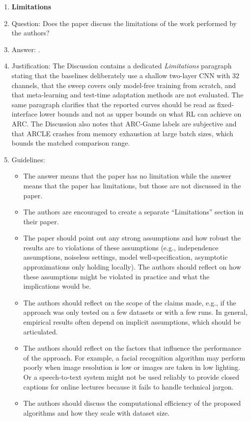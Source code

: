 \begin{enumerate}
\item {\bf Limitations}
    \item[] Question: Does the paper discuss the limitations of the work performed by the authors?
    \item[] Answer: \answerYes{}.
    \item[] Justification: The Discussion contains a dedicated \emph{Limitations} paragraph stating that the baselines deliberately use a shallow two-layer CNN with $32$ channels, that the sweep covers only model-free training from scratch, and that meta-learning and test-time adaptation methods are not evaluated. The same paragraph clarifies that the reported curves should be read as fixed-interface lower bounds and not as upper bounds on what RL can achieve on ARC. The Discussion also notes that ARC-Game labels are subjective and that ARCLE crashes from memory exhaustion at large batch sizes, which bounds the matched comparison range.
    \item[] Guidelines:
    \begin{itemize}
        \item The answer \answerNA{} means that the paper has no limitation while the answer \answerNo{} means that the paper has limitations, but those are not discussed in the paper. 
        \item The authors are encouraged to create a separate ``Limitations'' section in their paper.
        \item The paper should point out any strong assumptions and how robust the results are to violations of these assumptions (e.g., independence assumptions, noiseless settings, model well-specification, asymptotic approximations only holding locally). The authors should reflect on how these assumptions might be violated in practice and what the implications would be.
        \item The authors should reflect on the scope of the claims made, e.g., if the approach was only tested on a few datasets or with a few runs. In general, empirical results often depend on implicit assumptions, which should be articulated.
        \item The authors should reflect on the factors that influence the performance of the approach. For example, a facial recognition algorithm may perform poorly when image resolution is low or images are taken in low lighting. Or a speech-to-text system might not be used reliably to provide closed captions for online lectures because it fails to handle technical jargon.
        \item The authors should discuss the computational efficiency of the proposed algorithms and how they scale with dataset size.

\end{itemize}
\end{enumerate}
